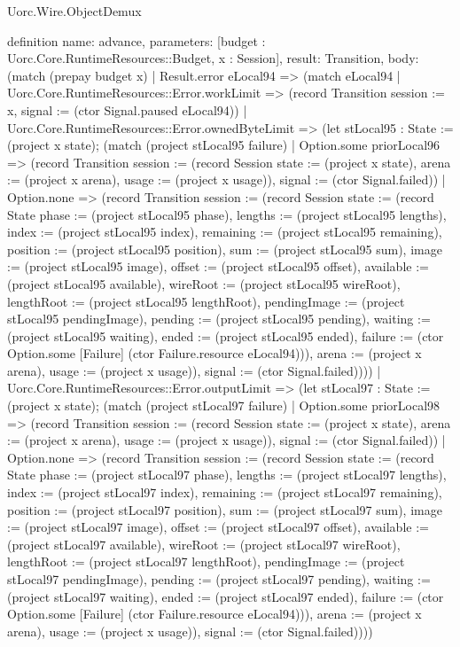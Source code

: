 \begin{lexlean}{Uorc.Wire.ObjectDemux}
\begin{semanticmodule}
definition{
  name: advance,
  parameters: [budget : Uorc.Core.RuntimeResources::Budget, x : Session],
  result: Transition,
  body: (match (prepay budget x)
    | Result.error eLocal94 => (match eLocal94
      | Uorc.Core.RuntimeResources::Error.workLimit => (record Transition {session := x, signal := (ctor Signal.paused eLocal94)})
      | Uorc.Core.RuntimeResources::Error.ownedByteLimit => (let stLocal95 : State := (project x state); (match (project stLocal95 failure)
        | Option.some priorLocal96 => (record Transition {session := (record Session {state := (project x state), arena := (project x arena), usage := (project x usage)}), signal := (ctor Signal.failed)})
        | Option.none => (record Transition {session := (record Session {state := (record State {phase := (project stLocal95 phase), lengths := (project stLocal95 lengths), index := (project stLocal95 index), remaining := (project stLocal95 remaining), position := (project stLocal95 position), sum := (project stLocal95 sum), image := (project stLocal95 image), offset := (project stLocal95 offset), available := (project stLocal95 available), wireRoot := (project stLocal95 wireRoot), lengthRoot := (project stLocal95 lengthRoot), pendingImage := (project stLocal95 pendingImage), pending := (project stLocal95 pending), waiting := (project stLocal95 waiting), ended := (project stLocal95 ended), failure := (ctor Option.some [Failure] (ctor Failure.resource eLocal94))}), arena := (project x arena), usage := (project x usage)}), signal := (ctor Signal.failed)})))
      | Uorc.Core.RuntimeResources::Error.outputLimit => (let stLocal97 : State := (project x state); (match (project stLocal97 failure)
        | Option.some priorLocal98 => (record Transition {session := (record Session {state := (project x state), arena := (project x arena), usage := (project x usage)}), signal := (ctor Signal.failed)})
        | Option.none => (record Transition {session := (record Session {state := (record State {phase := (project stLocal97 phase), lengths := (project stLocal97 lengths), index := (project stLocal97 index), remaining := (project stLocal97 remaining), position := (project stLocal97 position), sum := (project stLocal97 sum), image := (project stLocal97 image), offset := (project stLocal97 offset), available := (project stLocal97 available), wireRoot := (project stLocal97 wireRoot), lengthRoot := (project stLocal97 lengthRoot), pendingImage := (project stLocal97 pendingImage), pending := (project stLocal97 pending), waiting := (project stLocal97 waiting), ended := (project stLocal97 ended), failure := (ctor Option.some [Failure] (ctor Failure.resource eLocal94))}), arena := (project x arena), usage := (project x usage)}), signal := (ctor Signal.failed)})))
}
\end{semanticmodule}
\end{lexlean}
